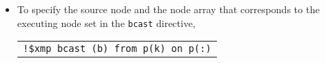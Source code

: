 \begin{itemize}
\item To specify the source node and the node array that corresponds to
      the executing node set in the {\tt bcast} directive,


\begin{tabular}{l}
\verb|!$xmp bcast (b) from p(k) on p(:)| \\
\end{tabular}
\end{itemize}

%


%

